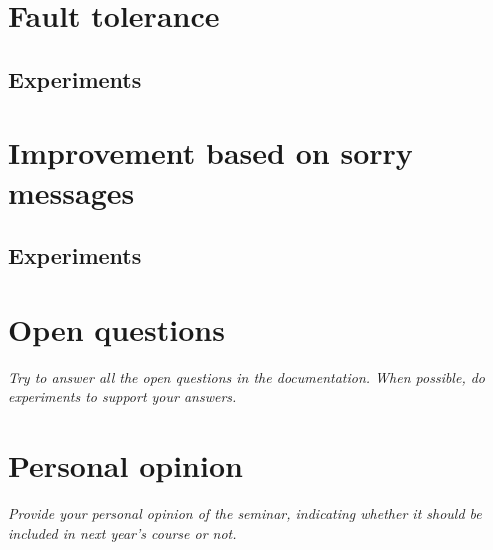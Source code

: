 \documentclass[a4paper, 10pt]{article}
\begin{document}
\section{Fault tolerance}

\subsection{Experiments}

\section{Improvement based on sorry messages}
\label{sec:improvement}

\subsection{Experiments}

\section{Open questions}

\textit{Try to answer all the open questions in the documentation. When possible, do experiments to support your answers.}

\section{Personal opinion}

\textit{Provide your personal opinion of the seminar, indicating whether it should be included in next year's course or not.}
\end{document}
